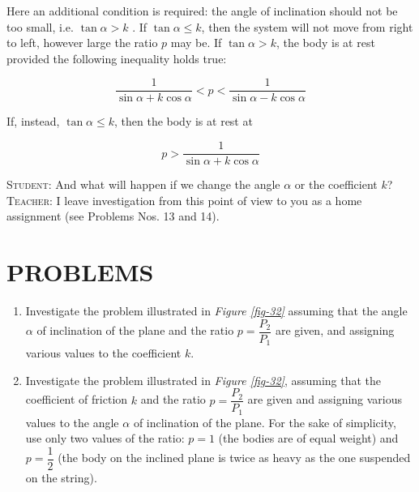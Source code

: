 \documentclass[a4paper,sfsidenotes]{tufte-book}
\begin{document}
Here an additional condition is required: the angle of inclination should not be too small, i.e. $\tan \alpha >k$ . If $\tan \alpha \leqslant k$, then the system will not move from right to left, however large the ratio $p$ may be. If $\tan \alpha >k$, the body is at rest provided the following inequality holds true:

\begin{equation*}
 \frac{1}{\sin \alpha + k \cos \alpha} < p < \frac{1}{\sin \alpha - k \cos \alpha}
\end{equation*}

If, instead, $\tan \alpha \leqslant k$, then the body is at rest at

\begin{equation*}
p > \frac{1}{\sin \alpha + k \cos \alpha}
\end{equation*}

\textsc{Student:} And what will happen if we change the angle $\alpha$ or the coefficient $k$?
\\
\textsc{Teacher:} I leave investigation from this point of view to you as a home assignment (see Problems Nos. 13 and 14).
\\
\section{PROBLEMS}
\label{problems-03}

\begin{enumerate}[resume*=problems]
\item Investigate the problem illustrated in \emph{Figure \ref{fig-32}} assuming that the
angle $\alpha$ of inclination of the plane and the ratio $p=\dfrac{P_{2} }{P_{1}}$ are given, and
assigning various values to the coefficient $k$.
\item Investigate the problem illustrated in \emph{Figure \ref{fig-32}}, assuming that the
coefficient of friction $k$ and the ratio $p=\dfrac{P_{2} }{P_{1}}$ are given and assigning
various values to the angle $\alpha$ of inclination of the plane. For the sake of
simplicity, use only two values of the ratio: $p= 1$ (the bodies are of equal
weight) and $p= \dfrac{1}{2}$ (the body on the inclined plane is twice as heavy as
the one suspended on the string).
\end{enumerate}
\cleardoublepage
\thispagestyle{empty}
\vspace*{2cm}
\end{document}

